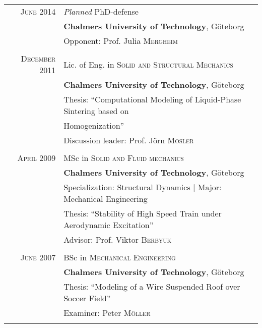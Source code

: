 \documentclass[a4paper,10pt]{article} %
\begin{document}
\begin{tabular}{rl}


\textsc{June} 2014 & \textit{Planned} PhD-defense \\
& \textbf{Chalmers University of Technology}, Göteborg\\
& \small Opponent: Prof. Julia \textsc{Mergheim}\\
&\\


\textsc{December} 2011 & Lic. of Eng. in \textsc{Solid and Structural Mechanics} \\
& \textbf{Chalmers University of Technology}, Göteborg\\
& Thesis: ``Computational Modeling of Liquid-Phase Sintering based on \\
& Homogenization''\\
& \small Discussion leader: Prof. Jörn \textsc{Mosler}\\
&\\


\textsc{April} 2009 & MSc in \textsc{Solid and Fluid mechanics}\\
& \textbf{Chalmers University of Technology}, Göteborg\\
& Specialization: Structural Dynamics | Major: Mechanical Engineering\\
& Thesis: ``Stability of High Speed Train under Aerodynamic Excitation''\\
& \small Advisor: Prof. Viktor \textsc{Berbyuk}\\
&\\


\textsc{June} 2007 & BSc in \textsc{Mechanical Engineering}\\
& \textbf{Chalmers University of Technology}, Göteborg\\
& Thesis: ``Modeling of a Wire Suspended Roof over Soccer Field''\\
& \small Examiner: Peter \textsc{Möller}\\
&\\


\end{tabular}
\end{document}

